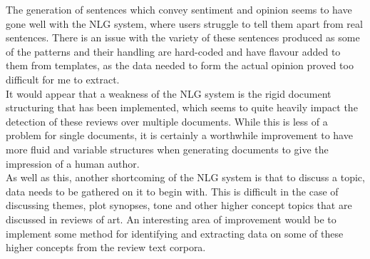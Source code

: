 The generation of sentences which convey sentiment and opinion seems to have gone well with the NLG system, where users struggle to tell them apart from real sentences. There is an issue with the variety of these sentences produced as some of the patterns and their handling are hard-coded and have flavour added to them from templates, as the data needed to form the actual opinion proved too difficult for me to extract.\\

It would appear that a weakness of the NLG system is the rigid document structuring that has been implemented, which seems to quite heavily impact the detection of these reviews over multiple documents. While this is less of a problem for single documents, it is certainly a worthwhile improvement to have more fluid and variable structures when generating documents to give the impression of a human author.\\
As well as this, another shortcoming of the NLG system is that to discuss a topic, data needs to be gathered on it to begin with. This is difficult in the case of discussing themes, plot synopses, tone and other higher concept topics that are discussed in reviews of art. An interesting area of improvement would be to implement some method for identifying and extracting data on some of these higher concepts from the review text corpora.


